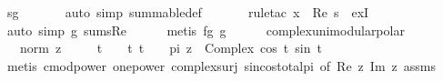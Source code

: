 \begin{isabellebody}
\ sg\isanewline
\ \ \ \ \ \isamarkupfalse%
\ {\isacharparenleft}{\kern0pt}auto\ simp{\isacharcolon}{\kern0pt}\ summable{\isacharunderscore}{\kern0pt}def{\isacharparenright}{\kern0pt}\isanewline
\ \ \ \ \ \isamarkupfalse%
\ {\isacharparenleft}{\kern0pt}rule{\isacharunderscore}{\kern0pt}tac\ x\ {\isacharequal}{\kern0pt}\ {\isachardoublequoteopen}Re\ s{\isachardoublequoteclose}\ \ exI{\isacharparenright}{\kern0pt}\isanewline
\ \ \ \ \ \isamarkupfalse%
\ {\isacharparenleft}{\kern0pt}auto\ simp{\isacharcolon}{\kern0pt}\ g\ sums{\isacharunderscore}{\kern0pt}Re{\isacharparenright}{\kern0pt}\isanewline
\ \ \ \ \isamarkupfalse%
\ {\isacharparenleft}{\kern0pt}metis\ fg\ g{\isacharparenright}{\kern0pt}\isanewline
\ \ \ \ \isamarkupfalse%
\isanewline
{}\isamarkupfalse%
%
\endisatagproof
{\isafoldproof}%
%
\isadelimproof
%
\endisadelimproof
%
\isadelimdocument
%
\endisadelimdocument
%
\isatagdocument
%
\isamarkuptrue%
%
\endisatagdocument
{\isafolddocument}%
%
\isadelimdocument
%
\endisadelimdocument
{}\isamarkupfalse%
\ complex{\isacharunderscore}{\kern0pt}unimodular{\isacharunderscore}{\kern0pt}polar{\isacharcolon}{\kern0pt}\isanewline
\ \ \ {\isachardoublequoteopen}norm\ z\ {\isacharequal}{\kern0pt}\ {}{\isachardoublequoteclose}\isanewline
\ \ \ t\ \ {\isachardoublequoteopen}{}\ {\isasymle}\ t{\isachardoublequoteclose}\ {\isachardoublequoteopen}t\ {\isacharless}{\kern0pt}\ {}\ {\isacharasterisk}{\kern0pt}\ pi{\isachardoublequoteclose}\ {\isachardoublequoteopen}z\ {\isacharequal}{\kern0pt}\ Complex\ {\isacharparenleft}{\kern0pt}cos\ t{\isacharparenright}{\kern0pt}\ {\isacharparenleft}{\kern0pt}sin\ t{\isacharparenright}{\kern0pt}{\isachardoublequoteclose}\isanewline
%
\isadelimproof
\ \ %
\endisadelimproof
%
\isatagproof
{}\isamarkupfalse%
\ {\isacharparenleft}{\kern0pt}metis\ cmod{\isacharunderscore}{\kern0pt}power{}\ one{\isacharunderscore}{\kern0pt}power{}\ complex{\isacharunderscore}{\kern0pt}surj\ sincos{\isacharunderscore}{\kern0pt}total{\isacharunderscore}{\kern0pt}{}pi\ {\isacharbrackleft}{\kern0pt}of\ {\isachardoublequoteopen}Re\ z{\isachardoublequoteclose}\ {\isachardoublequoteopen}Im\ z{\isachardoublequoteclose}{\isacharbrackright}{\kern0pt}\ assms{\isacharparenright}{\kern0pt}%
\endisatagproof
{\isafoldproof}%
%
\isadelimproof

\end{isabellebody}
